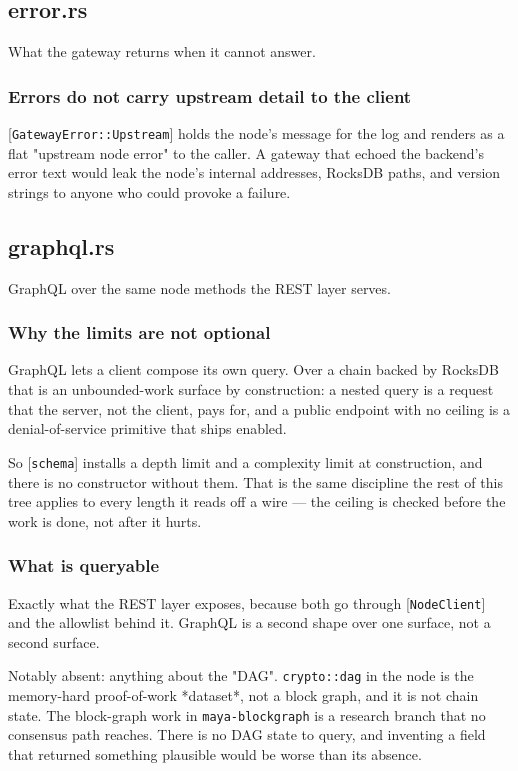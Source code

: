 \documentclass[11pt,a4paper]{article}
\begin{document}
\subsection{error.rs}
What the gateway returns when it cannot answer.

\subsubsection{Errors do not carry upstream detail to the client}

[\texttt{GatewayError::Upstream}] holds the node's message for the log and renders
as a flat "upstream node error" to the caller. A gateway that echoed the
backend's error text would leak the node's internal addresses, RocksDB
paths, and version strings to anyone who could provoke a failure.

\subsection{graphql.rs}
GraphQL over the same node methods the REST layer serves.

\subsubsection{Why the limits are not optional}

GraphQL lets a client compose its own query. Over a chain backed by RocksDB
that is an unbounded-work surface by construction: a nested query is a
request that the server, not the client, pays for, and a public endpoint
with no ceiling is a denial-of-service primitive that ships enabled.

So [\texttt{schema}] installs a depth limit and a complexity limit at construction,
and there is no constructor without them. That is the same discipline the
rest of this tree applies to every length it reads off a wire — the ceiling
is checked before the work is done, not after it hurts.

\subsubsection{What is queryable}

Exactly what the REST layer exposes, because both go through
[\texttt{NodeClient}] and the allowlist behind it. GraphQL is a second shape over
one surface, not a second surface.

Notably absent: anything about the "DAG". \texttt{crypto::dag} in the node is the
memory-hard proof-of-work *dataset*, not a block graph, and it is not chain
state. The block-graph work in \texttt{maya-blockgraph} is a research branch that
no consensus path reaches. There is no DAG state to query, and inventing a
field that returned something plausible would be worse than its absence.
\end{document}
